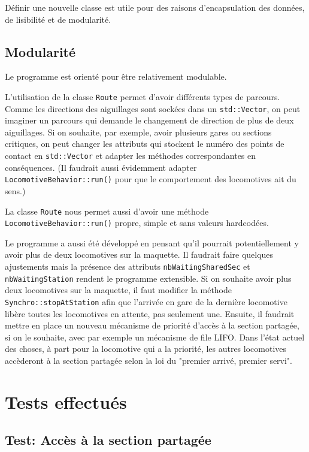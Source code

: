 \documentclass{article}
\begin{document}
Définir une nouvelle classe est utile pour des raisons d'encapsulation des données, de lisibilité et de modularité.

\subsection*{Modularité}
Le programme est orienté pour être relativement modulable.

L'utilisation de la classe \texttt{Route} permet d'avoir différents types de parcours. Comme les directions des aiguillages
sont sockées dans un \texttt{std::Vector}, on peut imaginer un parcours qui demande le changement de direction de plus de 
deux aiguillages. Si on souhaite, par exemple, avoir plusieurs gares ou sections critiques, on peut changer les attributs qui stockent
le numéro des points de contact en \texttt{std::Vector} et adapter les méthodes correspondantes en conséquences. (Il faudrait aussi 
évidemment adapter \texttt{LocomotiveBehavior::run()} pour que le comportement des locomotives ait du sens.)

La classe \texttt{Route} nous permet aussi d'avoir une méthode \texttt{LocomotiveBehavior::run()} propre, simple et sans valeurs 
hardcodées.

Le programme a aussi été développé en pensant qu'il pourrait potentiellement y avoir plus de deux locomotives sur la maquette. Il faudrait
faire quelques ajustements mais la présence des attributs \texttt{nbWaitingSharedSec} et \texttt{nbWaitingStation} rendent le programme
extensible. Si on souhaite avoir plus deux locomotives sur la  maquette, il faut modifier la méthode \texttt{Synchro::stopAtStation} afin
que l'arrivée en gare de la dernière locomotive libère toutes les locomotives en attente, pas seulement une. Ensuite, il faudrait 
mettre en place un nouveau mécanisme de priorité d'accès à la section partagée, si on le souhaite, avec par exemple un mécanisme de file
LIFO. Dans l'état actuel des choses, à part pour la locomotive qui a la priorité, les autres locomotives accèderont à la section partagée 
selon la loi du "premier arrivé, premier servi". 

\section*{Tests effectués}
\subsection*{Test: Accès à la section partagée}
\end{document}
